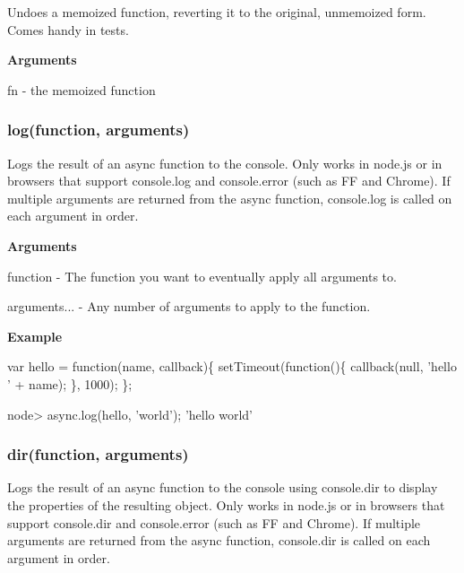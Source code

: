 Undoes a memoized function, reverting it to the original, unmemoized form. Comes handy in tests.

{\bfseries Arguments}


\begin{DoxyItemize}
\item fn -\/ the memoized function
\end{DoxyItemize}

\label{_log}%
 \subsubsection*{log(function, arguments)}

Logs the result of an async function to the console. Only works in node.\+js or in browsers that support console.\+log and console.\+error (such as F\+F and Chrome). If multiple arguments are returned from the async function, console.\+log is called on each argument in order.

{\bfseries Arguments}


\begin{DoxyItemize}
\item function -\/ The function you want to eventually apply all arguments to.
\item arguments... -\/ Any number of arguments to apply to the function.
\end{DoxyItemize}

{\bfseries Example}


\begin{DoxyCode}
var hello = \textcolor{keyword}{function}(name, callback)\{
    setTimeout(\textcolor{keyword}{function}()\{
        callback(null, \textcolor{stringliteral}{'hello '} + name);
    \}, 1000);
\};
\end{DoxyCode}
 
\begin{DoxyCode}
node> async.log(hello, \textcolor{stringliteral}{'world'});
\textcolor{stringliteral}{'hello world'}
\end{DoxyCode}
 



\label{_dir}%
 \subsubsection*{dir(function, arguments)}

Logs the result of an async function to the console using console.\+dir to display the properties of the resulting object. Only works in node.\+js or in browsers that support console.\+dir and console.\+error (such as F\+F and Chrome). If multiple arguments are returned from the async function, console.\+dir is called on each argument in order.

